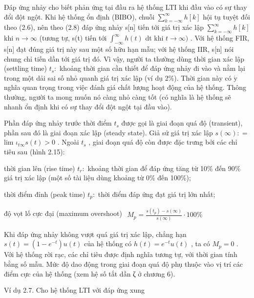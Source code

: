 \documentclass[
  10
]{article}
\begin{document}
Đáp ứng nhảy cho biết phản ứng tại đầu ra hệ thống LTI khi đầu vào có sự
thay đổi đột ngột. Khi hệ thống ổn định (BIBO), chuỗi
\(\scriptstyle \sum _ { k = - \infty } ^ { \infty } h [ k ]\) hội tụ
tuyệt đối theo (2.6), nên theo (2.8) đáp ứng nhảy s{[}n{]} tiến tới giá
trị xác lập
\(\scriptstyle \sum _ { k = - \infty } ^ { \infty } h [ k ]\) khi
\(n \to \infty\) (tương tự, s(t) tiến tới
\(\textstyle \int _ { - \infty } ^ { \infty } h ( t )\) dt khi
\(t \to \infty )\) . Với hệ thống FIR, s{[}n{]} đạt đúng giá trị này sau
một số hữu hạn mẫu; với hệ thống IIR, s{[}n{]} nói chung chỉ tiến dần
tới giá trị đó. Vì vậy, người ta thường dùng thời gian xác lập (settling
time) \(t _ { s } \mathrm { : }\) khoảng thời gian cần thiết để đáp ứng
nhảy đi vào và nằm lại trong một dải sai số nhỏ quanh giá trị xác lập
(ví dụ 2\%). Thời gian này có \(\acute { \mathrm { y } }\) nghĩa quan
trọng trong việc đánh giá chất lượng hoạt động của hệ thống. Thông
thường, người ta mong muốn nó càng nhỏ càng tốt (có nghĩa là hệ thống sẽ
nhanh ổn định khi có sự thay đổi đột ngột tại đầu vào).

Phần đáp ứng nhảy trước thời điểm \(t _ { s }\) được gọi là giai đoạn
quá độ (transient), phần sau đó là giai đoạn xác lập (steady state). Giả
sử giá trị xác lập \(s ( \infty ) : =\) lim
\(\iota _ { t  \infty } s ( t ) > 0\) . Ngoài \(t _ { s }\) , giai đoạn
quá độ còn được đặc trưng bởi các chỉ tiêu sau (hình 2.15):

thời gian lên (rise time) \(t _ { r } \colon\) khoảng thời gian để đáp
ứng tăng từ 10\% đến 90\% giá trị xác lập (một số tài liệu dùng khoảng
từ 0\% đến 100\%);

thời điểm đỉnh (peak time) \(t _ { p } \colon\) thời điểm đáp ứng đạt
giá trị lớn nhất;

độ vọt lố cực đại (maximum overshoot)
\(\begin{array} { r } { M _ { p } = \frac { s ( t _ { p } ) - s ( \infty ) } { s ( \infty ) } \cdot 1 0 0 \% } \end{array}\)

Khi đáp ứng nhảy không vượt quá giá trị xác lập, chẳng hạn
\(s ( t ) = ( 1 - e ^ { - t } ) u ( t )\) của hệ thống có
\(h ( t ) = e ^ { - t } u ( t )\) , ta có \(M _ { p } = 0\) . Với hệ
thống rời rạc, các chỉ tiêu được định nghĩa tương tự, với thời gian tính
bằng số mẫu. Mức độ dao động trong giai đoạn quá độ phụ thuộc vào vị trí
các điểm cực của hệ thống (xem hệ số tắt dần ζ ở chương 6).

Ví dụ 2.7. Cho hệ thống LTI với đáp ứng xung
\end{document}
